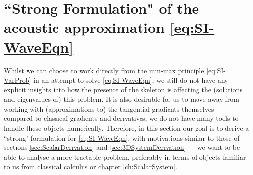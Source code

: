 \section{``Strong Formulation" of the acoustic approximation \eqref{eq:SI-WaveEqn}} \label{sec:SI-StrongDerivation}
Whilst we can choose to work directly from the min-max principle \eqref{eq:SI-VarProb} in an attempt to solve \eqref{eq:SI-WaveEqn}, we still do not have any explicit insights into how the presence of the skeleton is affecting the (solutions and eigenvalues of) this problem.
It is also desirable for us to move away from working with (approximations to) the tangential gradients themselves --- compared to classical gradients and derivatives, we do not have many tools to handle these objects numerically.
Therefore, in this section our goal is to derive a ``strong" formulation for \eqref{eq:SI-WaveEqn}, with motivations similar to those of sections \ref{sec:ScalarDerivation} and \ref{sec:3DSystemDerivation} --- we want to be able to analyse a more tractable problem, preferably in terms of objects familiar to us from classical calculus or chapter \ref{ch:ScalarSystem}.

